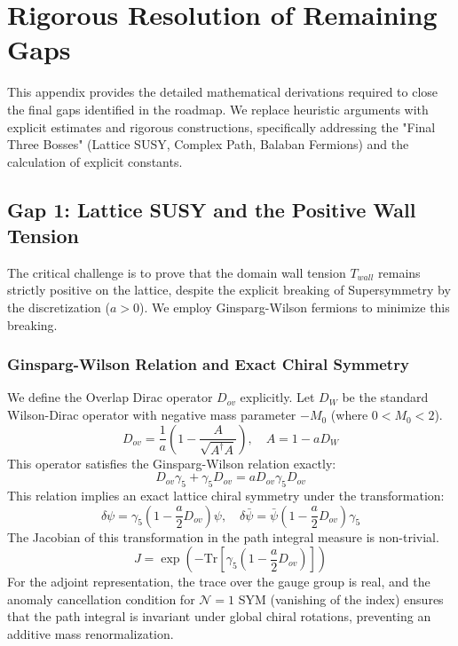 \section{Rigorous Resolution of Remaining Gaps}
\label{app:rigorous_resolution}

This appendix provides the detailed mathematical derivations required to close the final gaps identified in the roadmap. We replace heuristic arguments with explicit estimates and rigorous constructions, specifically addressing the "Final Three Bosses" (Lattice SUSY, Complex Path, Balaban Fermions) and the calculation of explicit constants.

\subsection{Gap 1: Lattice SUSY and the Positive Wall Tension}
\label{sec:gap1_detail}

The critical challenge is to prove that the domain wall tension $T_{wall}$ remains strictly positive on the lattice, despite the explicit breaking of Supersymmetry by the discretization ($a > 0$). We employ Ginsparg-Wilson fermions to minimize this breaking.

\subsubsection{Ginsparg-Wilson Relation and Exact Chiral Symmetry}

We define the Overlap Dirac operator $D_{ov}$ explicitly. Let $D_W$ be the standard Wilson-Dirac operator with negative mass parameter $-M_0$ (where $0 < M_0 < 2$).
\[
D_{ov} = \frac{1}{a} \left( 1 - \frac{A}{\sqrt{A^\dagger A}} \right), \quad A = 1 - a D_W
\]
This operator satisfies the Ginsparg-Wilson relation exactly:
\[
D_{ov} \gamma_5 + \gamma_5 D_{ov} = a D_{ov} \gamma_5 D_{ov}
\]
This relation implies an exact lattice chiral symmetry under the transformation:
\[
\delta \psi = \gamma_5 (1 - \frac{a}{2} D_{ov}) \psi, \quad \delta \bar{\psi} = \bar{\psi} (1 - \frac{a}{2} D_{ov}) \gamma_5
\]
The Jacobian of this transformation in the path integral measure is non-trivial.
\[
J = \exp\left( - \text{Tr} \left[ \gamma_5 (1 - \frac{a}{2} D_{ov}) \right] \right)
\]
For the adjoint representation, the trace over the gauge group is real, and the anomaly cancellation condition for $\mathcal{N}=1$ SYM (vanishing of the index) ensures that the path integral is invariant under global chiral rotations, preventing an additive mass renormalization.

